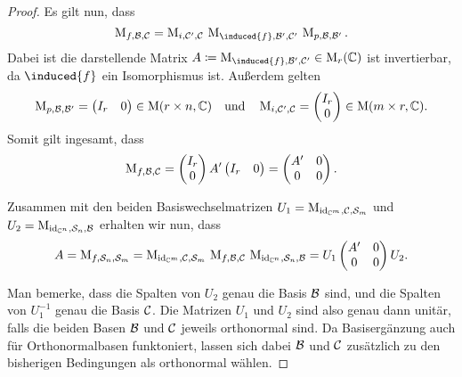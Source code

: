 \begin{proof}
  Es gilt nun, dass
  \[
        \repmatrix{f}{\basis{B}}{\basis{C}}
    =   \repmatrix{i}{\basis{C}'}{\basis{C}}
    \,  \repmatrix{\induced{f}}{\basis{B}'}{\basis{C}'}
    \,  \repmatrix{p}{\basis{B}}{\basis{B}'}.
  \]
  Dabei ist die darstellende Matrix $A \coloneqq \repmatrix{\induced{f}}{\basis{B}'}{\basis{C}'} \in \matrices{r}{\complex}$ ist invertierbar, da $\induced{f}$ ein Isomorphismus ist.
  Außerdem gelten
  \[
      \operatorname{M}_{p, \mathcal{B}, \mathcal{B}'}
    = \begin{pmatrix}
        I_r & 0
      \end{pmatrix}
      \in
      \operatorname{M}(r \times n, \mathbb{C})
    \quad
    \text{und}
    \quad
      \operatorname{M}_{i, \mathcal{C}', \mathcal{C}}
    = \begin{pmatrix}
        I_r \\
        0
      \end{pmatrix}
      \in
      \operatorname{M}(m \times r, \mathbb{C}).
  \]
  Somit gilt ingesamt, dass
  \[
    \operatorname{M}_{f, \mathcal{B}, \mathcal{C}}
    = \begin{pmatrix}
        I_r \\
        0
      \end{pmatrix}
      A'
      \begin{pmatrix}
        I_r & 0
      \end{pmatrix}
    = \begin{pmatrix}
        A' & 0  \\
        0  & 0
      \end{pmatrix}.
  \]
  
  Zusammen mit den beiden Basiswechselmatrizen $U_1 = \operatorname{M}_{\operatorname{id}_{\mathbb{C}^m}, \mathcal{C}, \mathcal{S}_m}$ und $U_2 = \operatorname{M}_{\operatorname{id}_{\mathbb{C}^n}, \mathcal{S}_n, \mathcal{B}}$ erhalten wir nun, dass
  \[
        A
    =   \operatorname{M}_{f, \mathcal{S}_n, \mathcal{S}_m}
    =   \operatorname{M}_{\operatorname{id}_{\mathbb{C}^m}, \mathcal{C}, \mathcal{S}_m}
    \,  \operatorname{M}_{f, \mathcal{B}, \mathcal{C}}
    \,  \operatorname{M}_{\operatorname{id}_{\mathbb{C}^n}, \mathcal{S}_n, \mathcal{B}}
    =   U_1
        \begin{pmatrix}
          A' & 0  \\
          0  & 0
        \end{pmatrix}
        U_2.
  \]
  
  Man bemerke, dass die Spalten von $U_2$ genau die Basis $\mathcal{B}$ sind, und die Spalten von $U_1^{-1}$ genau die Basis $\mathcal{C}$.
  Die Matrizen $U_1$ und $U_2$ sind also genau dann unitär, falls die beiden Basen $\mathcal{B}$ und $\mathcal{C}$ jeweils orthonormal sind.
  Da Basisergänzung auch für Orthonormalbasen funktoniert, lassen sich dabei $\mathcal{B}$ und $\mathcal{C}$ zusätzlich zu den bisherigen Bedingungen als orthonormal wählen.
\end{proof}



